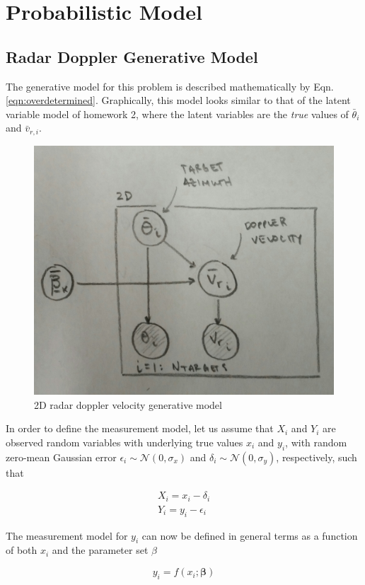 \documentclass[]{article}
\begin{document}
\section{Probabilistic Model}

\subsection{Radar Doppler Generative Model}

The generative model for this problem is described mathematically by Eqn. \ref{eqn:overdetermined}. Graphically, this model looks similar to that of the latent variable model of homework 2, where the latent variables are the \emph{true} values of $\bar{\theta}_i$ and $\bar{v}_{r,i}$.

\begin{figure}[H]
	\centering
	\captionsetup{justification=centering}
	\includegraphics[width=.50\textwidth]{graphicalmodel.jpg}
	\caption{\small 2D radar doppler velocity generative model}
\end{figure}

In order to define the measurement model, let us assume that $X_i$ and $Y_i$ are observed random variables with underlying true values $x_i$ and $y_i$, with random zero-mean Gaussian error $\epsilon_i \sim \mathcal{N}(0,\sigma_x)$ and $\delta_i \sim \mathcal{N}(0,\sigma_y)$, respectively, such that

\begin{equation}
	\begin{aligned}
	X_i = x_i - \delta_i \\
	Y_i = y_i - \epsilon_i
	\end{aligned}
\end{equation}

The measurement model for $y_i$ can now be defined in general terms as a function of both $x_i$ and the parameter set $\beta$

\begin{equation}
	y_i = f(x_i;\boldsymbol{\beta})
\end{equation}
\end{document}
